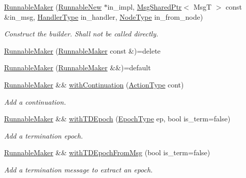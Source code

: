 \begin{DoxyCompactItemize}
\item 
\hyperlink{structvt_1_1runnable_1_1_runnable_maker_a8bdfaa900a10d5b950428476ae57c829}{Runnable\+Maker} (\hyperlink{structvt_1_1runnable_1_1_runnable_new}{Runnable\+New} $\ast$in\+\_\+impl, \hyperlink{namespacevt_ab2b3d506ec8e8d1540aede826d84a239}{Msg\+Shared\+Ptr}$<$ MsgT $>$ const \&in\+\_\+msg, \hyperlink{namespacevt_af64846b57dfcaf104da3ef6967917573}{Handler\+Type} in\+\_\+handler, \hyperlink{namespacevt_a866da9d0efc19c0a1ce79e9e492f47e2}{Node\+Type} in\+\_\+from\+\_\+node)
\begin{DoxyCompactList}\small\item\em Construct the builder. Shall not be called directly. \end{DoxyCompactList}\item 
\hyperlink{structvt_1_1runnable_1_1_runnable_maker_adf8ab1ce30a6577494f1c5dc4d454186}{Runnable\+Maker} (\hyperlink{structvt_1_1runnable_1_1_runnable_maker}{Runnable\+Maker} const \&)=delete
\item 
\hyperlink{structvt_1_1runnable_1_1_runnable_maker_abeee34efa8b7bc1586727bee5f71c6d4}{Runnable\+Maker} (\hyperlink{structvt_1_1runnable_1_1_runnable_maker}{Runnable\+Maker} \&\&)=default
\item 
\hyperlink{structvt_1_1runnable_1_1_runnable_maker}{Runnable\+Maker} \&\& \hyperlink{structvt_1_1runnable_1_1_runnable_maker_aa547117a9c2e36d77f60712ec78eef58}{with\+Continuation} (\hyperlink{namespacevt_ae0a5a7b18cc99d7b732cb4d44f46b0f3}{Action\+Type} cont)
\begin{DoxyCompactList}\small\item\em Add a continuation. \end{DoxyCompactList}\item 
\hyperlink{structvt_1_1runnable_1_1_runnable_maker}{Runnable\+Maker} \&\& \hyperlink{structvt_1_1runnable_1_1_runnable_maker_a60b98132fcf31de89854ca70c087eb0e}{with\+T\+D\+Epoch} (\hyperlink{namespacevt_a81d11b28122d43bf9834577e4a06440f}{Epoch\+Type} ep, bool is\+\_\+term=false)
\begin{DoxyCompactList}\small\item\em Add a termination epoch. \end{DoxyCompactList}\item 
\hyperlink{structvt_1_1runnable_1_1_runnable_maker}{Runnable\+Maker} \&\& \hyperlink{structvt_1_1runnable_1_1_runnable_maker_ab1d3e7c7e5da4cf309a58b0e4a17070e}{with\+T\+D\+Epoch\+From\+Msg} (bool is\+\_\+term=false)
\begin{DoxyCompactList}\small\item\em Add a termination message to extract an epoch. \end{DoxyCompactList}\item 

\end{DoxyCompactItemize}
